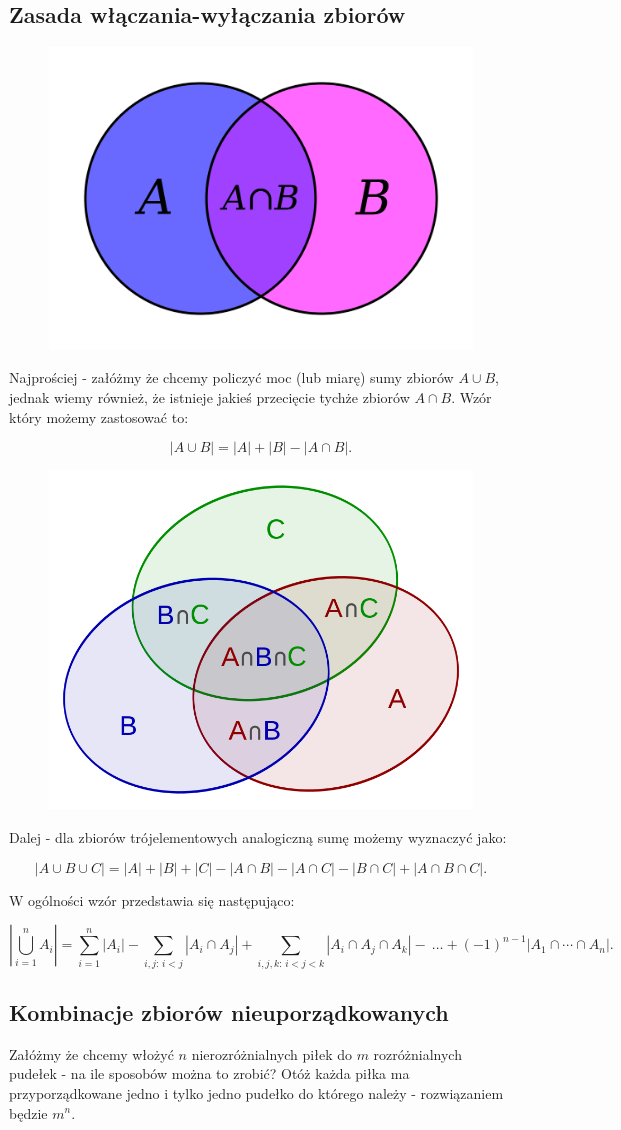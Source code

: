 \documentclass[11pt]{article}
\theoremstyle{definition}
\numberwithin{zadanie}{subsection}
\begin{document}
\subsection{Zasada włączania-wyłączania zbiorów}

\begin{figure}[H]
    \centering
    \includegraphics[width=0.3\linewidth]{ex-in-2.png}
\end{figure}

Najprościej - załóżmy że chcemy policzyć moc (lub miarę) sumy zbiorów $A\cup B$, jednak wiemy również, że istnieje jakieś przecięcie tychże zbiorów $A\cap B$. Wzór który możemy zastosować to:

$$|A\cup B| = |A|+|B| - |A\cap B|.$$

\begin{figure}[H]
    \centering
    \includegraphics[width=0.3\linewidth]{in-ex.png}
\end{figure}

Dalej - dla zbiorów trójelementowych analogiczną sumę możemy wyznaczyć jako:

$$|A\cup B\cup C| = |A|+|B|+|C| - |A\cap B| - |A\cap C| - |B\cap C| + |A\cap B\cap C|.$$


W ogólności wzór przedstawia się następująco:

$$\left|\bigcup_{i=1}^n A_i\right| = \sum_{i=1}^n\left|A_i\right|-\sum_{i,j:\,i<j}\left|A_i\cap A_j\right| + \sum_{i,j,k:\,i<j<k}\left|A_i\cap A_j\cap A_k\right|-\ \dots + (-1)^{n-1} \left|A_1\cap\cdots\cap A_n\right|.$$
\subsection{Kombinacje zbiorów nieuporządkowanych}

Załóżmy że chcemy włożyć $n$ nierozróżnialnych piłek do $m$ rozróżnialnych pudełek - na ile sposobów można to zrobić? Otóż każda piłka ma przyporządkowane jedno i tylko jedno pudełko do którego należy - rozwiązaniem będzie $m^n$.
\end{document}
